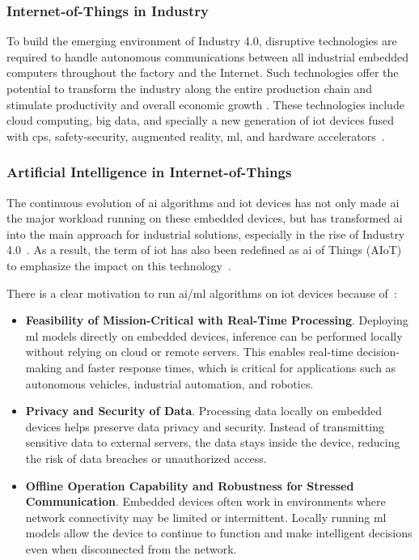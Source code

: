 \subsubsection{Internet-of-Things in Industry}
To build the emerging environment of Industry 4.0, disruptive technologies are required to handle autonomous communications between all industrial embedded computers throughout the factory and the Internet. Such technologies offer the potential to transform the industry along the entire production chain and stimulate productivity and overall economic growth \cite{espinoza2020estimating}. These technologies include cloud computing, big data, and specially a new generation of \gls{iot} devices fused with \gls{cps}, safety-security, augmented reality, \gls{ml}, and hardware accelerators~\cite{alcacer2019scanning}.

\subsubsection{Artificial Intelligence in Internet-of-Things}
The continuous evolution of \gls{ai} algorithms and \gls{iot} devices has not only made \gls{ai} the major workload running on these embedded devices, but has transformed \gls{ai} into the main approach for industrial solutions, especially in the rise of Industry 4.0~\cite{alcacer2019scanning}. As a result, the term of \gls{iot} has also been redefined as \gls{ai} of Things (AIoT) to emphasize the impact on this technology~\cite{zhang2020empowering}.

There is a clear motivation to run \gls{ai}/\gls{ml} algorithms on \gls{iot} devices because of~\cite{loh20201}:

\begin{itemize}
	\item \textbf{Feasibility of Mission-Critical with Real-Time Processing}. Deploying \gls{ml} models directly on embedded devices, inference can be performed locally without relying on cloud or remote servers. This enables real-time decision-making and faster response times, which is critical for applications such as autonomous vehicles, industrial automation, and robotics.
	\item \textbf{Privacy and Security of Data}. Processing data locally on embedded devices helps preserve data privacy and security. Instead of transmitting sensitive data to external servers, the data stays inside the device, reducing the risk of data breaches or unauthorized access.
	\item \textbf{Offline Operation Capability and Robustness for Stressed Communication}. Embedded devices often work in environments where network connectivity may be limited or intermittent. Locally running \gls{ml} models allow the device to continue to function and make intelligent decisions even when disconnected from the network.
\end{itemize}


